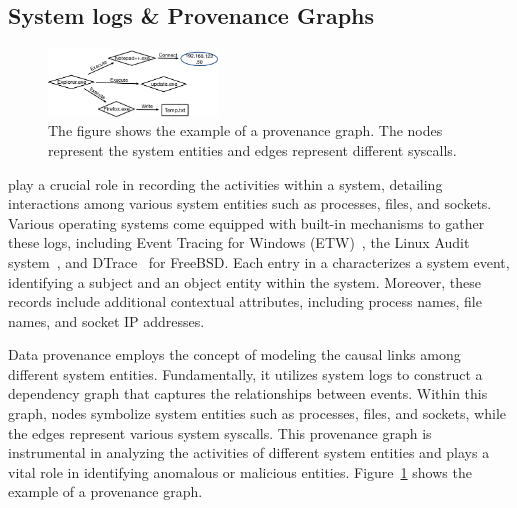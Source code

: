 
\subsection{System logs \& Provenance Graphs}

\begin{figure}[t!]
  \centering
  \includegraphics[width=0.4\textwidth]{fig/provexp.pdf}
  \caption{The figure shows the example of a provenance graph. The nodes represent the system entities and edges represent different syscalls.}

  \label{provexp}
  \vspace{-2ex}
\end{figure}


\Logs play a crucial role in recording the activities within a system, detailing interactions among various system entities such as processes, files, and sockets. Various operating systems come equipped with built-in mechanisms to gather these logs, including Event Tracing for Windows (ETW)~\cite{windowsaudit}, the Linux Audit system~\cite{linuxaudit}, and DTrace~\cite{dtrace} for FreeBSD. Each entry in a \logs  characterizes a system event, identifying a subject and an object entity within the system. Moreover, these records include additional contextual attributes, including process names, file names, and socket IP addresses.

Data provenance employs the concept of modeling the causal links among different system entities. Fundamentally, it utilizes system logs to construct a dependency graph that captures the relationships between events. Within this graph, nodes symbolize system entities such as processes, files, and sockets, while the edges represent various system syscalls. This provenance graph is instrumental in analyzing the activities of different system entities and plays a vital role in identifying anomalous or malicious entities. Figure~\ref{provexp} shows the example of a provenance graph. 

